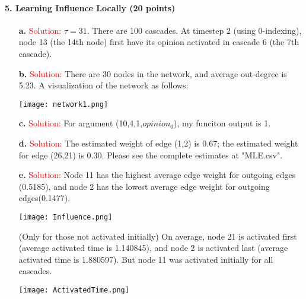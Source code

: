 \documentclass[11pt]{article} %
\begin{document}
\paragraph{5. Learning Influence Locally (20 points)} 
\begin{itemize}
\item[\textbf{a. }] 
\textcolor{red}{Solution:}
$\tau =31$. There are 100 cascades. At timestep 2 (using 0-indexing), node 13 (the 14th node) first have its opinion activated in cascade 6 (the 7th cascade).


\item[\textbf{b. }]
\textcolor{red}{Solution:}
There are 30 nodes in the network, and average out-degree is 5.23. A visualization of the network as follows:
\begin{center}
\texttt{[image: network1.png]}
\end{center}

\item[\textbf{c. }] 
\textcolor{red}{Solution:}
For argument (10,4,1,$opinion_0$), my funciton output is 1.

\item[\textbf{d. }]
\textcolor{red}{Solution:}
The estimated weight of edge (1,2) is  0.67; the estimated weight for edge (26,21) is 0.30. Please see the complete estimates at "MLE.csv". 
 
\item[\textbf{e. }] 
\textcolor{red}{Solution:}
Node 11 has the highest average edge weight for outgoing edges (0.5185), and node 2 has the lowest average edge weight for outgoing edges(0.1477). 
 \begin{center}
\texttt{[image: Influence.png]}
 \end{center}
(Only for those not activated initially) On average, node 21 is activated first (average activated time is 1.140845), and node 2 is activated last (average activated time is 1.880597). But node 11 was activated initially for all cascades.
\begin{center}
\texttt{[image: ActivatedTime.png]}
\end{center}
\end{itemize}
 
\end{document}
